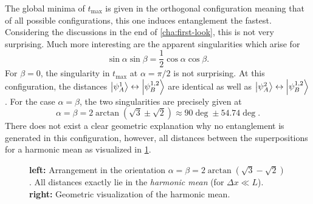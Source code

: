 The global minima of $t_\mathrm{max}$ is given in the orthogonal configuration meaning that of all possible configurations, this one induces entanglement the fastest. Considering the discussions in the end of \cref{cha:first-look}, this is not very surprising.
Much more interesting are the apparent singularities which arise for 
\begin{equation}
  \sin\alpha\sin\beta = \frac{1}{2}\cos\alpha\cos\beta .
\end{equation}
For $\beta=0$, the singularity in $t_\mathrm{max}$ at $\alpha=\pi/2$ is not surprising. At this configuration, the distances $\ket{\psi_A^1} \leftrightarrow \ket{\psi_B^{1,2}}$ are identical as well as $\ket{\psi_A^2} \leftrightarrow \ket{\psi_B^{1,2}}$. 
For the case $\alpha = \beta$, the two singularities are precisely given at
\begin{equation}
  \alpha = \beta = 2\arctan(\sqrt{3}\pm\sqrt{2}) \approx 90\deg \pm 54.74\deg.
\end{equation}
There does not exist a clear geometric explanation why no entanglement is generated in this configuration, however, all distances between the superpositions for a harmonic mean as visualized in \cref{fig:4:harmonic-mean}.
\begin{figure}[!htbp]
  \centering
  \def\svgwidth{\textwidth}
  
  \caption{\textbf{left:} Arrangement in the orientation $\alpha=\beta=2\arctan(\sqrt{3}-\sqrt{2})$. All distances exactly lie in the \textit{harmonic mean} (for $\Delta x \ll L$). \textbf{right:} Geometric visualization of the harmonic mean.}
  \label{fig:4:harmonic-mean}
\end{figure}





